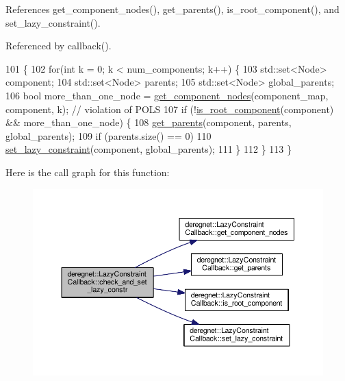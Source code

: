 References get\+\_\+component\+\_\+nodes(), get\+\_\+parents(), is\+\_\+root\+\_\+component(), and set\+\_\+lazy\+\_\+constraint().



Referenced by callback().


\begin{DoxyCode}
101                                                                                                          \{
102     \textcolor{keywordflow}{for}(\textcolor{keywordtype}{int} k = 0; k < num\_components; k++) \{
103         std::set<Node> component;
104         std::set<Node> parents;
105         std::set<Node> global\_parents;
106         \textcolor{keywordtype}{bool} more\_than\_one\_node = \hyperlink{classderegnet_1_1LazyConstraintCallback_a9ebed5d496c64603628b8655dd538839}{get\_component\_nodes}(component\_map, component, k);  \textcolor{comment}{//
       violation of POLS}
107         \textcolor{keywordflow}{if} (!\hyperlink{classderegnet_1_1LazyConstraintCallback_a3eb6c682c8e1129036f1218513d6feb0}{is\_root\_component}(component) && more\_than\_one\_node) \{
108             \hyperlink{classderegnet_1_1LazyConstraintCallback_ab1357c9415e190aaa56ed87022ec0b82}{get\_parents}(component, parents, global\_parents);
109             \textcolor{keywordflow}{if} (parents.size() == 0)
110                 \hyperlink{classderegnet_1_1LazyConstraintCallback_a8f6db7da84271afcd2e2169318569558}{set\_lazy\_constraint}(component, global\_parents);
111         \}
112     \}
113 \}
\end{DoxyCode}


Here is the call graph for this function\+:\nopagebreak
\begin{figure}[H]
\begin{center}
\leavevmode
\includegraphics[width=350pt]{classderegnet_1_1LazyConstraintCallback_a02eb39d4ea843597aa7c3382f17af874_cgraph}
\end{center}
\end{figure}




